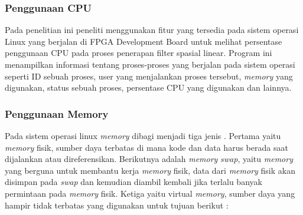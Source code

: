 \subsubsection{Penggunaan CPU}
Pada penelitian ini peneliti menggunakan fitur yang tersedia pada sistem operasi Linux yang berjalan di FPGA Development Board untuk melihat persentase penggunaan CPU pada proses penerapan filter spasial linear. Program ini menampilkan informasi tentang proses-proses yang berjalan pada sistem operasi seperti ID sebuah proses, user yang menjalankan proses tersebut, \textit{memory} yang digunakan, status sebuah proses, persentase CPU yang digunakan dan lainnya.


\subsubsection{Penggunaan Memory}

Pada sistem operasi linux \textit{memory} dibagi menjadi tiga jenis \cite{manual:linux}. Pertama yaitu \textit{memory} fisik, sumber daya terbatas di mana kode dan data harus berada saat dijalankan atau direferensikan. Berikutnya adalah \textit{memory} \textit{swap}, yaitu  \textit{memory} yang berguna untuk membantu kerja \textit{memory} fisik, data dari \textit{memory} fisik akan disimpan pada \textit{swap} dan kemudian diambil kembali jika terlalu banyak permintaan pada \textit{memory} fisik. Ketiga yaitu virtual \textit{memory}, sumber daya yang hampir tidak terbatas yang digunakan untuk tujuan berikut \cite{book:os}:

